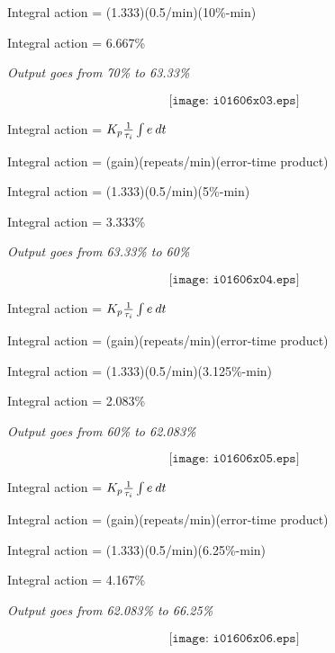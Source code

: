 Integral action = (1.333)(0.5/min)(10\%-min)
 
\vskip 10pt

Integral action = 6.667\%
 
\vskip 10pt

\noindent
{\it Output goes from 70\% to 63.33\%}
 
$$\texttt{[image: i01606x03.eps]}$$

\filbreak

Integral action = $K_p {1\over \tau_i} \int e \> dt$
 
\vskip 10pt

Integral action = (gain)(repeats/min)(error-time product)
 
\vskip 10pt

Integral action = (1.333)(0.5/min)(5\%-min)

\vskip 10pt

Integral action = 3.333\%

\vskip 10pt

\noindent
{\it Output goes from 63.33\% to 60\%}

$$\texttt{[image: i01606x04.eps]}$$

\filbreak

Integral action = $K_p {1\over \tau_i} \int e \> dt$
 
\vskip 10pt

Integral action = (gain)(repeats/min)(error-time product)
 
\vskip 10pt

Integral action = (1.333)(0.5/min)(3.125\%-min)
 
\vskip 10pt

Integral action = 2.083\%
 
\vskip 10pt

\noindent
{\it Output goes from 60\% to 62.083\%}

$$\texttt{[image: i01606x05.eps]}$$

\filbreak

Integral action = $K_p {1\over \tau_i} \int e \> dt$
 
\vskip 10pt

Integral action = (gain)(repeats/min)(error-time product)
 
\vskip 10pt

Integral action = (1.333)(0.5/min)(6.25\%-min)
 
\vskip 10pt

Integral action = 4.167\%

\vskip 10pt

\noindent
{\it Output goes from 62.083\% to 66.25\%}

$$\texttt{[image: i01606x06.eps]}$$










